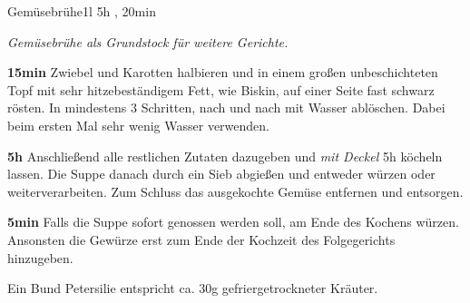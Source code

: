\documentclass[../recipe-collections/cooking.tex]{subfiles}
\begin{document}
\begin{recipe}{Gemüsebrühe}{1l }{5h , 20min }

  \freeform{}\textit{Gemüsebrühe als Grundstock für weitere Gerichte.}


  \textbf{15min}
  Zwiebel und Karotten halbieren und in einem großen unbeschichteten Topf mit sehr hitzebeständigem Fett, wie Biskin, auf einer Seite fast schwarz rösten.
  In mindestens 3 Schritten, nach und nach mit Wasser ablöschen.
  Dabei beim ersten Mal sehr wenig Wasser verwenden.


  \textbf{5h}
  Anschließend alle restlichen Zutaten dazugeben und \textit{mit Deckel} 5h köcheln lassen.
  Die Suppe danach durch ein Sieb abgießen und entweder würzen oder weiterverarbeiten.
  Zum Schluss das ausgekochte Gemüse entfernen und entsorgen.


  \textbf{5min}
  Falls die Suppe sofort genossen werden soll, am Ende des Kochens würzen.
  Ansonsten die Gewürze erst zum Ende der Kochzeit des Folgegerichts hinzugeben.

  \freeform{}\hrulefill{}

  \freeform{}
  Ein Bund Petersilie entspricht ca. 30g gefriergetrockneter Kräuter.

\end{recipe}
\end{document}
